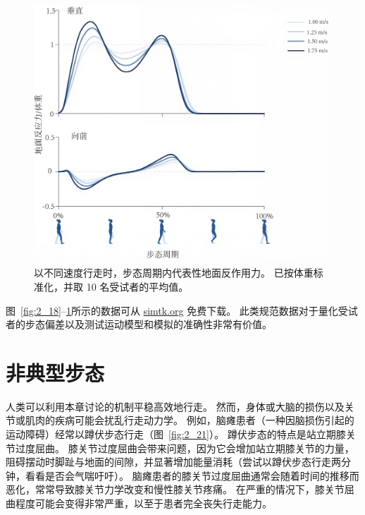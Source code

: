 \begin{figure}[!htb]
	\centering
	\includegraphics[width=0.95\linewidth]{chap2/2_20}
	\caption{以不同速度行走时，步态周期内代表性地面反作用力。
		已按体重标准化，并取 10 名受试者的平均值\cite{arnold2013muscle}。 \label{fig:2_20}}
\end{figure}


图~\ref{fig:2_18}–\ref{fig:2_20}所示的数据可从 \href{simtk.org}{simtk.org} 免费下载。
此类规范数据对于量化受试者的步态偏差以及测试运动模型和模拟的准确性非常有价值。


\section{非典型步态}

人类可以利用本章讨论的机制平稳高效地行走。
然而，身体或大脑的损伤以及关节或肌肉的疾病可能会扰乱行走动力学。
例如，脑瘫患者（一种因脑损伤引起的运动障碍）经常以蹲伏步态行走（图~\ref{fig:2_21}）。
蹲伏步态的特点是站立期膝关节过度屈曲。
膝关节过度屈曲会带来问题，因为它会增加站立期膝关节的力量，阻碍摆动时脚趾与地面的间隙，并显著增加能量消耗（尝试以蹲伏步态行走两分钟，看看是否会气喘吁吁）。
脑瘫患者的膝关节过度屈曲通常会随着时间的推移而恶化，常常导致膝关节力学改变和慢性膝关节疼痛。
在严重的情况下，膝关节屈曲程度可能会变得非常严重，以至于患者完全丧失行走能力。



